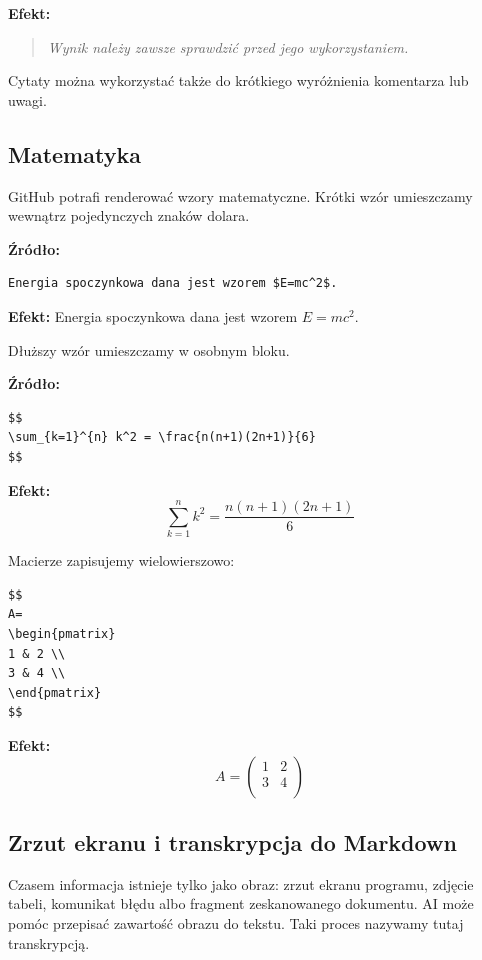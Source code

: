 \documentclass[11pt, a4paper]{article}
\begin{document}
\textbf{Efekt:}
\begin{quote}
\itshape Wynik należy zawsze sprawdzić przed jego wykorzystaniem.
\end{quote}

Cytaty można wykorzystać także do krótkiego wyróżnienia komentarza lub uwagi.

\hrulefill

\subsection{Matematyka}
GitHub potrafi renderować wzory matematyczne. Krótki wzór umieszczamy wewnątrz pojedynczych znaków dolara.

\textbf{Źródło:}
\begin{lstlisting}
Energia spoczynkowa dana jest wzorem $E=mc^2$.
\end{lstlisting}

\textbf{Efekt:} Energia spoczynkowa dana jest wzorem $E=mc^2$.

Dłuższy wzór umieszczamy w osobnym bloku.

\textbf{Źródło:}
\begin{lstlisting}
$$
\sum_{k=1}^{n} k^2 = \frac{n(n+1)(2n+1)}{6}
$$
\end{lstlisting}

\textbf{Efekt:}
$$
\sum_{k=1}^{n} k^2 = \frac{n(n+1)(2n+1)}{6}
$$

Macierze zapisujemy wielowierszowo:
\begin{lstlisting}
$$
A=
\begin{pmatrix}
1 & 2 \\
3 & 4 \\
\end{pmatrix}
$$
\end{lstlisting}

\textbf{Efekt:}
$$
A=
\begin{pmatrix}
1 & 2 \\
3 & 4 \\
\end{pmatrix}
$$

\hrulefill

\subsection{Zrzut ekranu i transkrypcja do Markdown}
Czasem informacja istnieje tylko jako obraz: zrzut ekranu programu, zdjęcie tabeli, komunikat błędu albo fragment zeskanowanego dokumentu. AI może pomóc przepisać zawartość obrazu do tekstu. Taki proces nazywamy tutaj transkrypcją.
\end{document}
